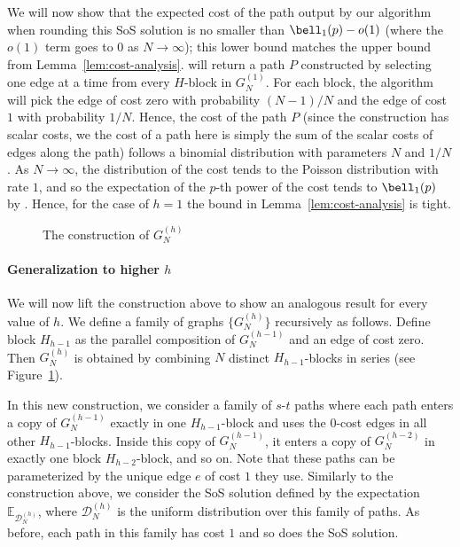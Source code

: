 \documentclass[11pt,a4paper]{article}
\begin{document}
We will now show that the expected cost of the path output by our algorithm when rounding this SoS solution is no smaller than $\bell_1(p) -o (1)$ (where the $o(1)$ term goes to $0$ as $N\to \infty$); this lower bound matches the upper bound from Lemma~\ref{lem:cost-analysis}.  will return a path $P$ constructed by selecting one edge at a time from every $H$-block in $G^{(1)}_N$. For each block, the algorithm will pick the edge of cost zero with probability ${(N-1 )/ N}$ and the edge of cost $1$ with probability $1/N$.
Hence, the cost of the path $P$ (since the construction has scalar costs, we the cost of a path here is simply the sum of the scalar costs of edges along the path) follows a binomial distribution with parameters $N$ and ${1/N}$. As $N \to \infty$, the distribution of the cost tends to the Poisson distribution with rate $1$, and so the expectation of the \(p\)-th power of the cost tends to $\bell_1(p)$ by . Hence, for the case of $h=1$ the bound in Lemma~\ref{lem:cost-analysis} is tight.

\begin{figure}[t]
    \centering
    
    \caption{The construction of $G^{(h)}_N$}
    \label{fig:second-tightness-proof}
\end{figure}

\paragraph{Generalization to higher \(h\)} We will now lift the construction above to show an analogous result for every value of $h$. We define a family of graphs $\{G^{(h)}_N\}$ recursively as follows.  Define block $H_{h-1}$ as the parallel composition of $G^{(h-1)}_N$ and an edge of cost zero. Then $G^{(h)}_N$ is obtained by combining $N$ distinct $H_{h-1}$-blocks in series (see Figure~\ref{fig:second-tightness-proof}).

In this new construction, we consider a family of $s$-$t$  paths where each path enters a copy of $G_N^{(h-1)}$ exactly in one $H_{h-1}$-block and uses the $0$-cost edges in all other $H_{h-1}$-blocks. Inside this copy of $G_N^{(h-1)}$, it enters a copy of $G_N^{(h-2)}$ in exactly one block $H_{h-2}$-block, and so on.
Note that these paths can be parameterized by the unique edge $e$ of cost $1$ they use. Similarly to the construction above, we consider the SoS solution defined by the expectation $\mathbb{E}_{\mathcal{D}_N^{(h)}}$, where $\mathcal{D}_N^{(h)}$ is the uniform distribution over this family of paths. As before, each path in this family has cost $1$ and so does the SoS solution. 
\end{document}
